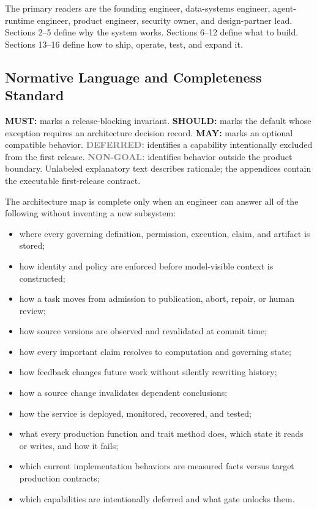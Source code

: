 \documentclass[10pt]{article}
\newcommand{\must}{\textbf{\textcolor{amosblue}{MUST:}}\xspace}
\newcommand{\should}{\textbf{\textcolor{amosblue}{SHOULD:}}\xspace}
\newcommand{\may}{\textbf{\textcolor{amosblue}{MAY:}}\xspace}
\newcommand{\deferred}{\textbf{\textcolor{gray}{DEFERRED:}}\xspace}
\newcommand{\nongoal}{\textbf{\textcolor{gray}{NON-GOAL:}}\xspace}
\begin{document}
The primary readers are the founding engineer, data-systems engineer, agent-runtime engineer, product engineer, security owner, and design-partner lead. Sections 2--5 define why the system works. Sections 6--12 define what to build. Sections 13--16 define how to ship, operate, test, and expand it.

\subsection{Normative Language and Completeness Standard}

\must marks a release-blocking invariant. \should marks the default whose exception requires an architecture decision record. \may marks an optional compatible behavior. \deferred identifies a capability intentionally excluded from the first release. \nongoal identifies behavior outside the product boundary. Unlabeled explanatory text describes rationale; the appendices contain the executable first-release contract.

The architecture map is complete only when an engineer can answer all of the following without inventing a new subsystem:
\begin{itemize}
  \item where every governing definition, permission, execution, claim, and artifact is stored;
  \item how identity and policy are enforced before model-visible context is constructed;
  \item how a task moves from admission to publication, abort, repair, or human review;
  \item how source versions are observed and revalidated at commit time;
  \item how every important claim resolves to computation and governing state;
  \item how feedback changes future work without silently rewriting history;
  \item how a source change invalidates dependent conclusions;
  \item how the service is deployed, monitored, recovered, and tested;
  \item what every production function and trait method does, which state it reads or writes, and how it fails;
  \item which current implementation behaviors are measured facts versus target production contracts;
  \item which capabilities are intentionally deferred and what gate unlocks them.
\end{itemize}
\end{document}
